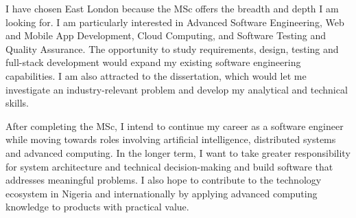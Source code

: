 \documentclass[11pt,a4paper]{article}
\begin{document}
I have chosen East London because the MSc offers the breadth and depth I am looking for. I am particularly interested in Advanced Software Engineering, Web and Mobile App Development, Cloud Computing, and Software Testing and Quality Assurance. The opportunity to study requirements, design, testing and full-stack development would expand my existing software engineering capabilities. I am also attracted to the dissertation, which would let me investigate an industry-relevant problem and develop my analytical and technical skills.

After completing the MSc, I intend to continue my career as a software engineer while moving towards roles involving artificial intelligence, distributed systems and advanced computing. In the longer term, I want to take greater responsibility for system architecture and technical decision-making and build software that addresses meaningful problems. I also hope to contribute to the technology ecosystem in Nigeria and internationally by applying advanced computing knowledge to products with practical value.
\end{document}
